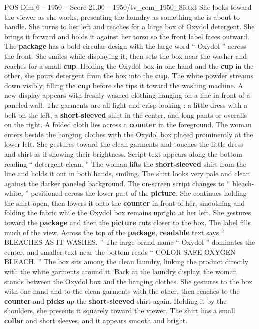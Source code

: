 \begin{textsample}{POS Dim 6 – 1950 – Score 21.00 – 1950/tv\_com\_1950\_86.txt}
She looks toward the viewer as she works, presenting the laundry as something she is about to handle.
She turns to her left and reaches for a large box of Oxydol detergent.
She brings it forward and holds it against her torso so the front label faces outward.
The \textbf{package} has a bold circular design with the large word “ Oxydol ” across the front.
She smiles while displaying it, then sets the box near the washer and reaches for a small \textbf{cup}.
Holding the Oxydol box in one hand and the \textbf{cup} in the other, she pours detergent from the box into the \textbf{cup}.
The white powder streams down visibly, filling the \textbf{cup} before she tips it toward the washing machine.
A new display appears with freshly washed clothing hanging on a line in front of a paneled wall.
The garments are all light and crisp-looking : a little dress with a belt on the left, a \textbf{short-sleeved} shirt in the center, and long pants or overalls on the right.
A folded cloth lies across a \textbf{counter} in the foreground.
The woman enters beside the hanging clothes with the Oxydol box placed prominently at the lower left.
She gestures toward the clean garments and touches the little dress and shirt as if showing their brightness.
Script text appears along the bottom reading “ detergent-clean. ” The woman lifts the \textbf{short-sleeved} shirt from the line and holds it out in both hands, smiling.
The shirt looks very pale and clean against the darker paneled background.
The on-screen script changes to “ bleach-white, ” positioned across the lower part of the \textbf{picture}.
She continues holding the shirt open, then lowers it onto the \textbf{counter} in front of her, smoothing and folding the fabric while the Oxydol box remains upright at her left.
She gestures toward the \textbf{package} and then the \textbf{picture} cuts closer to the box.
The label fills much of the view.
Across the top of the \textbf{package}, \textbf{readable} text says “ BLEACHES AS IT WASHES. ” The large brand name “ Oxydol ” dominates the center, and smaller text near the bottom reads “ COLOR-SAFE OXYGEN BLEACH. ” The box sits among the clean laundry, linking the product directly with the white garments around it.
Back at the laundry display, the woman stands between the Oxydol box and the hanging clothes.
She gestures to the box with one hand and to the clean garments with the other, then reaches to the \textbf{counter} and \textbf{picks} up the \textbf{short-sleeved} shirt again.
Holding it by the shoulders, she presents it squarely toward the viewer.
The shirt has a small \textbf{collar} and short sleeves, and it appears smooth and bright.

\end{textsample}
